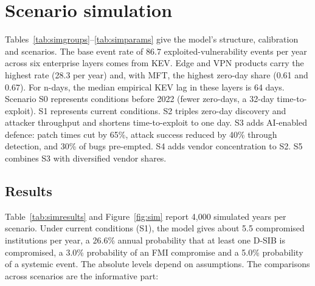 \section{Scenario simulation}\label{sec:sim}

Tables~\ref{tab:simgroups}--\ref{tab:simparams} give the model's structure, calibration and scenarios. The base event rate of 86.7 exploited-vulnerability events per year across six enterprise layers comes from KEV. Edge and VPN products carry the highest rate (28.3 per year) and, with MFT, the highest zero-day share (0.61 and 0.67). For n-days, the median empirical KEV lag in these layers is 64 days. Scenario S0 represents conditions before 2022 (fewer zero-days, a 32-day time-to-exploit). S1 represents current conditions. S2 triples zero-day discovery and attacker throughput and shortens time-to-exploit to one day. S3 adds AI-enabled defence: patch times cut by 65\%, attack success reduced by 40\% through detection, and 30\% of bugs pre-empted. S4 adds vendor concentration to S2. S5 combines S3 with diversified vendor shares.

\begin{table}[!htbp]
\centering
\caption{Simulated institution groups (stylised; patch medians refer to critical internet-facing vulnerabilities).}
\label{tab:simgroups}
\small

\end{table}

\begin{table}[!htbp]
\centering
\caption{Layer calibration from the KEV panel (CVEs published 2023--2025).}
\label{tab:simlayers}
\small
\resizebox{\textwidth}{!}{}
\end{table}

\begin{table}[!htbp]
\centering
\caption{Scenario parameters. $m_d$: discovery multiplier; $\tau$: zero-day copycat time-to-exploit (days); $\kappa$: n-day lag factor; $p_{\text{mass}}$: share of mass campaigns; $m_o$: attacker throughput; $\beta$: patch-time factor; $\delta$: success factor (detection); $\phi$: pre-emption share.}
\label{tab:simparams}
\small
\resizebox{\textwidth}{!}{}
\end{table}

\subsection{Results}
Table~\ref{tab:simresults} and Figure~\ref{fig:sim} report 4,000 simulated years per scenario. Under current conditions (S1), the model gives about 5.5 compromised institutions per year, a 26.6\% annual probability that at least one D-SIB is compromised, a 3.0\% probability of an FMI compromise and a 5.0\% probability of a systemic event. The absolute levels depend on assumptions. The comparisons across scenarios are the informative part:

